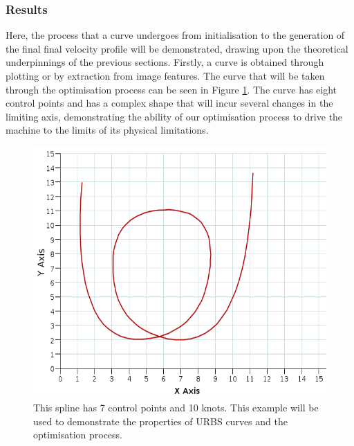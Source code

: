 \subsubsection{Results}
Here, the process that a curve undergoes from initialisation to the generation of the final final velocity profile will be demonstrated, drawing upon the theoretical underpinnings of the previous sections.
Firstly, a curve is obtained through plotting or by extraction from image features. The curve that will be taken through the optimisation process can be seen in Figure \ref{fig:example}. The curve has eight control points and has a complex shape that will incur several changes in the limiting axis, demonstrating the ability of our optimisation process to drive the machine to the limits of its physical limitations.

\begin{figure}  
\includegraphics[width=\textwidth]{figures/optimisation/exampleSpline.png}
\caption[Optimisation example curve]{ This spline has 7 control points and 10 knots. This example will be used to demonstrate the properties of URBS curves and the optimisation process.
\label{fig:example}}
\end{figure}

